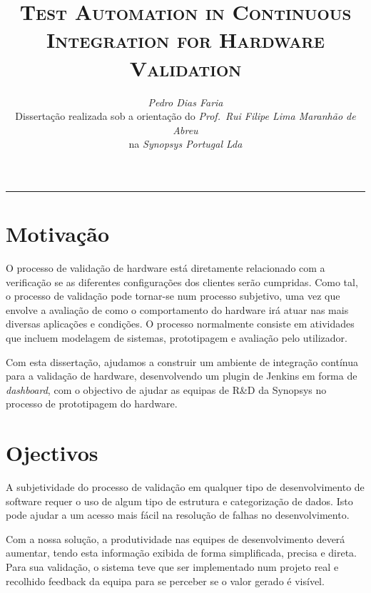\documentclass[9pt,a4paper]{extarticle}
\begin{document}
\title{\vspace*{-8mm}\textbf{\textsc{Test Automation in Continuous Integration for Hardware Validation}}}
\author{\emph{Pedro Dias Faria}\\[2mm]
\small{Dissertação realizada sob a orientação do \emph{Prof.\ Rui Filipe Lima Maranhão de Abreu}}\\
\small{na \emph{Synopsys Portugal Lda}}}
\date{}
\maketitle
\thispagestyle{empty}

\vspace*{-4mm}\noindent\rule{\textwidth}{0.4pt}\vspace*{4mm}

\begin{multicols}{2}

\section{Motivação}\label{sec:motiva}

O processo de validação de hardware está diretamente relacionado com a verificação se as diferentes configurações dos clientes serão cumpridas. Como tal, o processo de validação pode tornar-se num processo subjetivo, uma vez que envolve a avaliação de como o comportamento do hardware irá atuar nas mais diversas aplicações e condições. O processo normalmente consiste em atividades que incluem modelagem de sistemas, prototipagem e avaliação pelo utilizador\cite{TroyScott}\cite{Puri-Jobi2015}.

Com esta dissertação, ajudamos a construir um ambiente de integração contínua para a validação de hardware, desenvolvendo um plugin de Jenkins em forma de \textit{dashboard}, com o objectivo de ajudar as equipas de R\&D da Synopsys no processo de prototipagem do hardware.

\section{Ojectivos}\label{sec:goals}
A subjetividade do processo de validação em qualquer tipo de desenvolvimento de software requer o uso de algum tipo de estrutura e categorização de dados. Isto pode ajudar a um acesso mais fácil na resolução de falhas no desenvolvimento.

Com a nossa solução, a produtividade nas equipes de desenvolvimento deverá aumentar, tendo esta informação exibida de forma simplificada, precisa e direta.
Para sua validação, o sistema teve que ser implementado num projeto real e recolhido feedback da equipa para se perceber se o valor gerado é visível.


\end{multicols}
\end{document}
